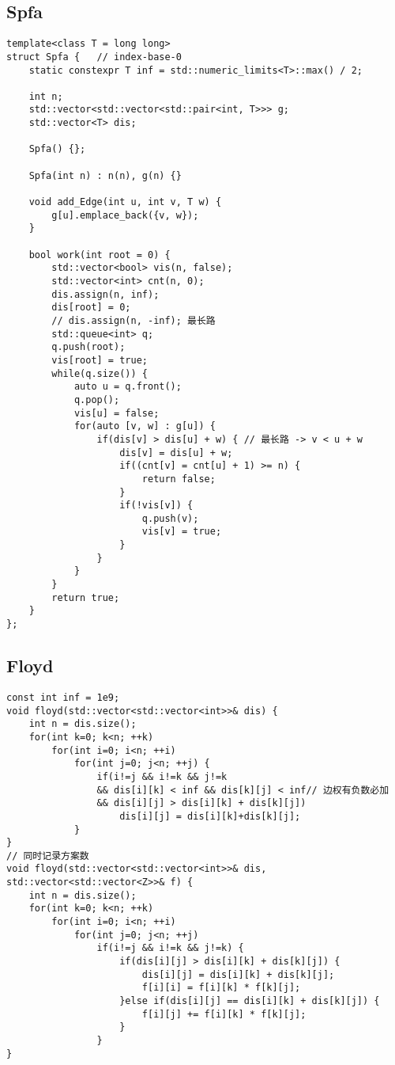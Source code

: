 \subsection{Spfa}
\begin{lstlisting}
template<class T = long long>
struct Spfa {   // index-base-0
	static constexpr T inf = std::numeric_limits<T>::max() / 2;

	int n;
	std::vector<std::vector<std::pair<int, T>>> g;
	std::vector<T> dis;

	Spfa() {};

	Spfa(int n) : n(n), g(n) {}

	void add_Edge(int u, int v, T w) {
        g[u].emplace_back({v, w});
	}

	bool work(int root = 0) {
		std::vector<bool> vis(n, false);
		std::vector<int> cnt(n, 0);
        dis.assign(n, inf);
		dis[root] = 0;
        // dis.assign(n, -inf); 最长路
		std::queue<int> q;
		q.push(root);
		vis[root] = true;
		while(q.size()) {
			auto u = q.front();
			q.pop();
			vis[u] = false;
			for(auto [v, w] : g[u]) {
                if(dis[v] > dis[u] + w) { // 最长路 -> v < u + w
                    dis[v] = dis[u] + w;
                    if((cnt[v] = cnt[u] + 1) >= n) {
                        return false;
                    }
                    if(!vis[v]) {
                        q.push(v);
                        vis[v] = true;
                    }
                }
			}
		}
		return true;
	}
};
\end{lstlisting}

\subsection{Floyd}
\begin{lstlisting}
const int inf = 1e9;
void floyd(std::vector<std::vector<int>>& dis) {
    int n = dis.size();
    for(int k=0; k<n; ++k)
        for(int i=0; i<n; ++i)
            for(int j=0; j<n; ++j) {
                if(i!=j && i!=k && j!=k 
                && dis[i][k] < inf && dis[k][j] < inf// 边权有负数必加
                && dis[i][j] > dis[i][k] + dis[k][j])
                    dis[i][j] = dis[i][k]+dis[k][j];
            }
}
// 同时记录方案数
void floyd(std::vector<std::vector<int>>& dis, std::vector<std::vector<Z>>& f) {
    int n = dis.size();
    for(int k=0; k<n; ++k)
        for(int i=0; i<n; ++i)
            for(int j=0; j<n; ++j)
                if(i!=j && i!=k && j!=k) {
                    if(dis[i][j] > dis[i][k] + dis[k][j]) {
                        dis[i][j] = dis[i][k] + dis[k][j];
                        f[i][i] = f[i][k] * f[k][j];
                    }else if(dis[i][j] == dis[i][k] + dis[k][j]) {
                        f[i][j] += f[i][k] * f[k][j];
                    }
                }
}
\end{lstlisting}

